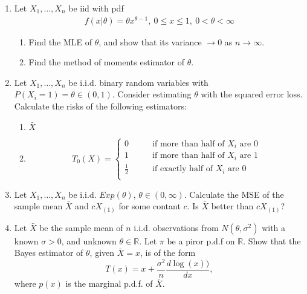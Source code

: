 \documentclass[12pt]{extarticle}
\begin{document}
\begin{enumerate}
	\item Let $X_1, ..., X_n$ be iid with pdf 
\begin{align*}
f(x|\theta)=\theta x^{\theta-1}, \: 0 \leq x \leq 1,\: 0<\theta<\infty
\end{align*}
\begin{enumerate}
	\item Find the MLE of $\theta$, and show that its variance $\rightarrow 0$ as $n \rightarrow \infty$.
	\item Find the method of moments estimator of $\theta$.
\end{enumerate}
\vspace{4cm}


\item Let $X_1,\dots,X_n$ be i.i.d. binary random variables with $P(X_i=1)=\theta\in(0,1).$ Consider estimating $\theta$ with the squared error loss. Calculate the risks of the following estimators:
\begin{enumerate}
	\item $\bar{X}$
	\item 
	$$T_0(X)=\left\{ 
	\begin{aligned}
	0& \qquad\mbox{if more than half of $X_i$ are 0} \\
	1&  \qquad \mbox{if more than half of $X_i$ are 1}\\
	\frac{1}{2}&\qquad\mbox{if exactly half of $X_i$ are 0}\\
	\end{aligned}
	\right.$$

\end{enumerate}
\vspace{4cm}

\item Let $X_1,\dots,X_n$ be i.i.d. $Exp(\theta)$, $\theta\in (0,\infty)$. Calculate the MSE of the sample mean $\bar{X}$ and $cX_{(1)}$ for some contant $c$. Is $\bar{X}$ better than $cX_{(1)}$?
\vspace{4cm}

\item Let $\bar{X}$ be the sample mean of $n$ i.i.d. observations from $N(\theta,\sigma^2)$ with a known $\sigma>0$, and unknown $\theta\in \mathbb{R}$. Let $\pi$ be a piror p.d.f on $\mathbb{R}$.
Show that the Bayes estimator of $\theta$, given $\bar{X}=x$, is of the form 
$$T(x)=x+\frac{\sigma^2}{n}\frac{d \log(x))}{d x}, $$ 
where $p(x)$ is the marginal p.d.f. of $\bar{X}$.
\end{enumerate}

\end{document}
